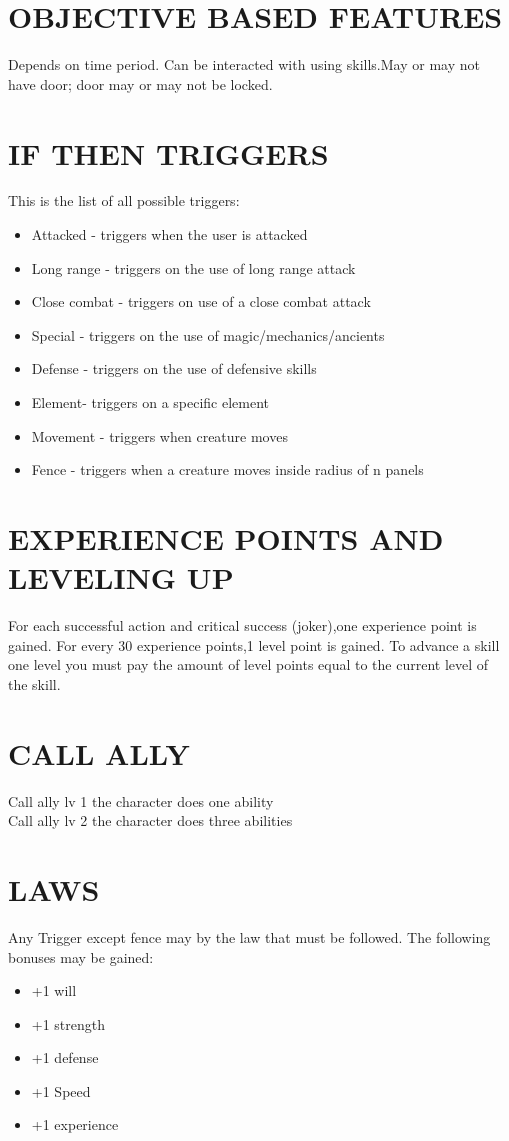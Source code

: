 \section{OBJECTIVE BASED FEATURES}
Depends on time period.  Can be interacted with using skills.May or may not have door; door may or may not be locked.

\section{IF THEN TRIGGERS}
This is the list of all possible triggers:
\begin{itemize}
\item Attacked - triggers when the user is attacked
\item Long range - triggers on the use of long range attack
\item Close combat - triggers on use of a close combat attack
\item Special - triggers on the use of magic/mechanics/ancients
\item Defense - triggers on the use of defensive skills
\item Element- triggers on a specific element
\item Movement - triggers when creature moves
\item Fence - triggers when a creature moves inside radius of n panels
\end{itemize}

\section{EXPERIENCE POINTS AND LEVELING UP}
For each successful action and critical success (joker),one experience point is gained.  For every 30 experience points,1 level point is gained.  To advance a skill one level you must pay the amount of level points equal to the current level of the skill.

\section{CALL ALLY}
Call ally lv 1 the character does one ability\\
Call ally lv 2 the character does three abilities\\

\section{LAWS}
Any Trigger except fence may by the law that must be followed.  The following bonuses may be gained:
\begin{itemize}
\item +1 will
\item +1 strength
\item +1 defense
\item +1 Speed
\item +1 experience
\end{itemize}

